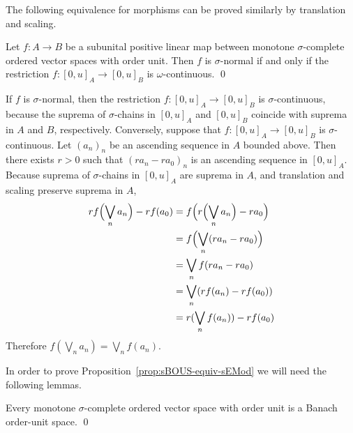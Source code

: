 \documentclass[%
	submission,
copyright,creativecommons,UKenglish]{eptcs}
\begin{document}
The following equivalence for morphisms
can be proved similarly by translation and scaling.

\begin{lemma}
\label{lem:monotone-sigma-complete-iff-omega-complete-morphism}
Let $f\colon A\to B$ be a subunital positive linear map
between monotone $\sigma$-complete
ordered vector spaces with order unit.
Then $f$ is $\sigma$-normal if and only if
the restriction $f\colon [0,u]_A\to[0,u]_B$
is $\omega$-continuous.
\qed
\end{lemma}
\begin{Auxproof}
If $f$ is $\sigma$-normal,
then the restriction $f\colon [0,u]_A\to[0,u]_B$
is $\sigma$-continuous,
because the suprema of $\sigma$-chains
in $[0,u]_A$ and $[0,u]_B$
coincide with suprema in $A$ and $B$, respectively.
Conversely, suppose that $f\colon [0,u]_A\to[0,u]_B$
is $\sigma$-continuous.
Let $(a_n)_n$ be an ascending sequence in $A$ bounded above.
Then there exists $r>0$ such that
$(ra_n-ra_0)_n$ is an ascending sequence in $[0,u]_A$.
Because
suprema of $\sigma$-chains in $[0,u]_A$ are suprema in $A$,
and translation and scaling preserve suprema in $A$,
\begin{align*}
r f \qty\Big(\bigvee_n a_n)-r f(a_0)
&= f\qty\Big(r\qty\Big(\bigvee_n a_n)-r a_0) \\
&= f\qty\Big(\bigvee_n (ra_n-ra_0)) \\
&=\bigvee_n f( ra_n-ra_0) \\
&=\bigvee_n (r f(a_n) - rf(a_0)) \\
&= r (\bigvee_n f(a_n)) - rf(a_0)
\end{align*}
Therefore $f (\bigvee_n a_n)=\bigvee_n f(a_n)$.
\end{Auxproof}

In order to prove Proposition~\ref{prop:sBOUS-equiv-sEMod}
we will need the following lemmas.

\begin{lemma}
\label{lem:monotone-sigma-complete-bous}
Every monotone $\sigma$-complete
ordered vector space with order unit
is a Banach order-unit space.
\qed
\end{lemma}
\end{document}
